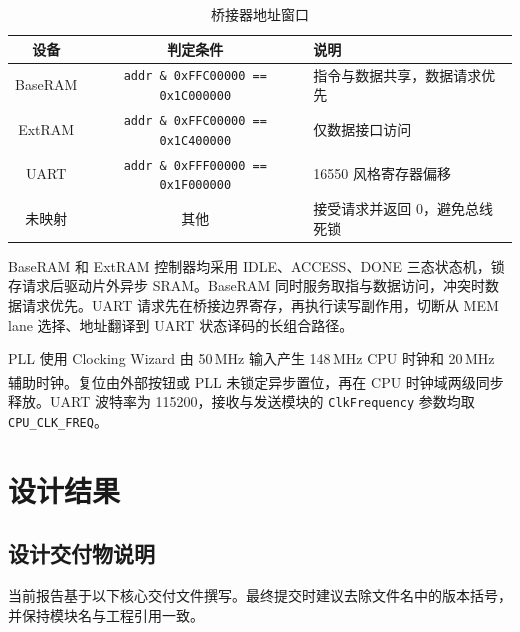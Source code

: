 \documentclass[UTF8,a4paper,zihao=5,fontset=none]{ctexart}
\newcommand{\upcite}[1]{\textsuperscript{\cite{#1}}}
\newcommand{\code}[1]{\nolinkurl{#1}}
\begin{document}
\begin{table}[H]
  \centering
  \caption{桥接器地址窗口}
  \label{tab:address_map}
  \begin{tabular}{c c l}
    \toprule
    设备      & 判定条件                                    & 说明               \\
    \midrule
    BaseRAM & \code{addr \& 0xFFC00000 == 0x1C000000} & 指令与数据共享，数据请求优先   \\
    ExtRAM  & \code{addr \& 0xFFC00000 == 0x1C400000} & 仅数据接口访问          \\
    UART    & \code{addr \& 0xFFF00000 == 0x1F000000} & 16550 风格寄存器偏移    \\
    未映射     & 其他                                      & 接受请求并返回 0，避免总线死锁 \\
    \bottomrule
  \end{tabular}
\end{table}

BaseRAM 和 ExtRAM 控制器均采用 IDLE、ACCESS、DONE 三态状态机，锁存请求后驱动片外异步 SRAM。BaseRAM 同时服务取指与数据访问，冲突时数据请求优先。UART 请求先在桥接边界寄存，再执行读写副作用，切断从 MEM lane 选择、地址翻译到 UART 状态译码的长组合路径。

PLL 使用 Clocking Wizard 由 50\,MHz 输入产生 148\,MHz CPU 时钟和 20\,MHz 辅助时钟\upcite{xilinxclk}。复位由外部按钮或 PLL 未锁定异步置位，再在 CPU 时钟域两级同步释放。UART 波特率为 115200，接收与发送模块的 \code{ClkFrequency} 参数均取 \code{CPU_CLK_FREQ}。

\section{设计结果}

\subsection{设计交付物说明}

当前报告基于以下核心交付文件撰写。最终提交时建议去除文件名中的版本括号，并保持模块名与工程引用一致。
\end{document}
